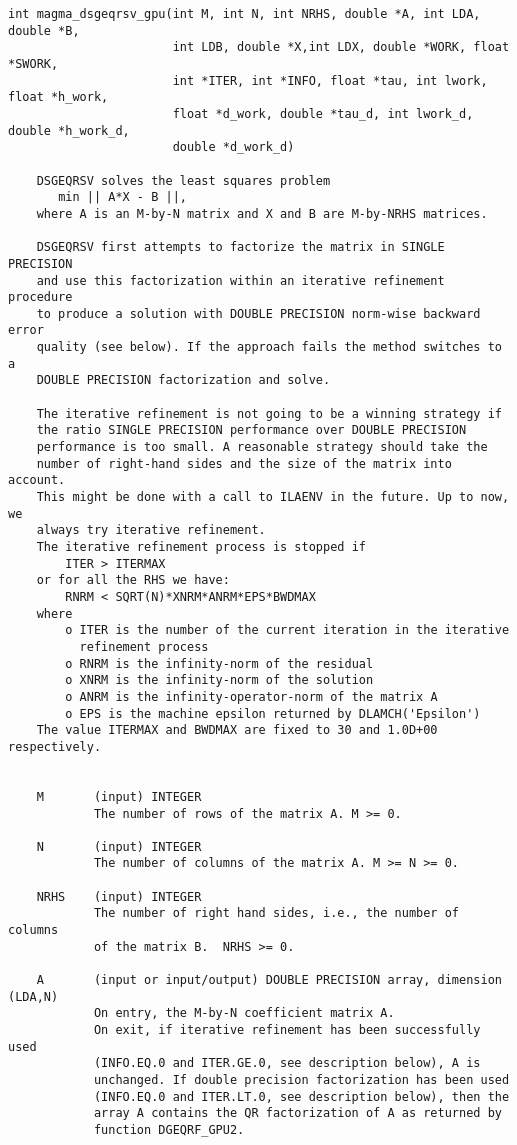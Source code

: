 \documentclass[10pt]{book}
\begin{document}
\begin{verbatim}
int magma_dsgeqrsv_gpu(int M, int N, int NRHS, double *A, int LDA, double *B, 
                       int LDB, double *X,int LDX, double *WORK, float *SWORK, 
                       int *ITER, int *INFO, float *tau, int lwork, float *h_work,
                       float *d_work, double *tau_d, int lwork_d, double *h_work_d,
                       double *d_work_d)

    DSGEQRSV solves the least squares problem 
       min || A*X - B ||,
    where A is an M-by-N matrix and X and B are M-by-NRHS matrices.

    DSGEQRSV first attempts to factorize the matrix in SINGLE PRECISION
    and use this factorization within an iterative refinement procedure
    to produce a solution with DOUBLE PRECISION norm-wise backward error
    quality (see below). If the approach fails the method switches to a
    DOUBLE PRECISION factorization and solve.

    The iterative refinement is not going to be a winning strategy if
    the ratio SINGLE PRECISION performance over DOUBLE PRECISION
    performance is too small. A reasonable strategy should take the
    number of right-hand sides and the size of the matrix into account.
    This might be done with a call to ILAENV in the future. Up to now, we
    always try iterative refinement.
    The iterative refinement process is stopped if
        ITER > ITERMAX
    or for all the RHS we have:
        RNRM < SQRT(N)*XNRM*ANRM*EPS*BWDMAX
    where
        o ITER is the number of the current iteration in the iterative
          refinement process
        o RNRM is the infinity-norm of the residual
        o XNRM is the infinity-norm of the solution
        o ANRM is the infinity-operator-norm of the matrix A
        o EPS is the machine epsilon returned by DLAMCH('Epsilon')
    The value ITERMAX and BWDMAX are fixed to 30 and 1.0D+00 respectively.


    M       (input) INTEGER   
            The number of rows of the matrix A. M >= 0.

    N       (input) INTEGER
            The number of columns of the matrix A. M >= N >= 0.

    NRHS    (input) INTEGER
            The number of right hand sides, i.e., the number of columns
            of the matrix B.  NRHS >= 0.

    A       (input or input/output) DOUBLE PRECISION array, dimension (LDA,N)
            On entry, the M-by-N coefficient matrix A.
            On exit, if iterative refinement has been successfully used
            (INFO.EQ.0 and ITER.GE.0, see description below), A is
            unchanged. If double precision factorization has been used
            (INFO.EQ.0 and ITER.LT.0, see description below), then the
            array A contains the QR factorization of A as returned by
            function DGEQRF_GPU2.


\end{verbatim}
\end{document}
